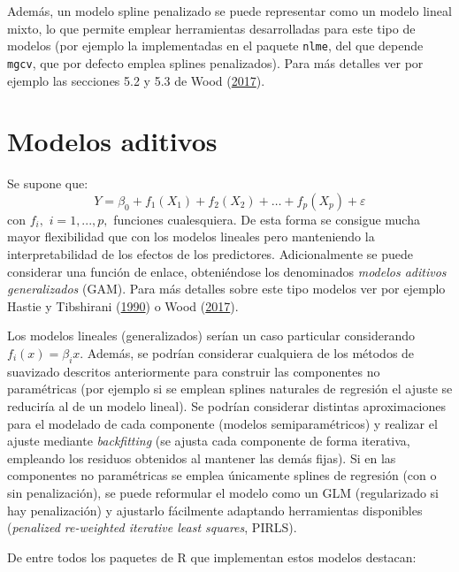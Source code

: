 \documentclass[
  spanish,
]{book}
\theoremstyle{break}
\theoremstyle{definition}
\theoremstyle{definition}
\theoremstyle{definition}
\theoremstyle{remark}
\begin{document}
Además, un modelo spline penalizado se puede representar como un modelo lineal mixto, lo que permite emplear herramientas desarrolladas para este tipo de modelos (por ejemplo la implementadas en el paquete \texttt{nlme}, del que depende \texttt{mgcv}, que por defecto emplea splines penalizados).
Para más detalles ver por ejemplo las secciones 5.2 y 5.3 de Wood (\protect\hyperlink{ref-wood2017generalized}{2017}).

\hypertarget{modelos-aditivos}{%
\section{Modelos aditivos}\label{modelos-aditivos}}

Se supone que:
\[Y= \beta_{0} + f_1(X_1) + f_2(X_2) + \ldots + f_p(X_p)  + \varepsilon\]
con \(f_{i},\) \(i=1,...,p,\) funciones cualesquiera.
De esta forma se consigue mucha mayor flexibilidad que con los modelos lineales pero manteniendo la interpretabilidad de los efectos de los predictores.
Adicionalmente se puede considerar una función de enlace, obteniéndose los denominados \emph{modelos aditivos generalizados} (GAM). Para más detalles sobre este tipo modelos ver por ejemplo Hastie y Tibshirani (\protect\hyperlink{ref-hastie1990generalized}{1990}) o Wood (\protect\hyperlink{ref-wood2017generalized}{2017}).

Los modelos lineales (generalizados) serían un caso particular considerando \(f_{i}(x) = \beta_{i}x\).
Además, se podrían considerar cualquiera de los métodos de suavizado descritos anteriormente para construir las componentes no paramétricas (por ejemplo si se emplean splines naturales de regresión el ajuste se reduciría al de un modelo lineal).
Se podrían considerar distintas aproximaciones para el modelado de cada componente (modelos semiparamétricos) y realizar el ajuste mediante \emph{backfitting} (se ajusta cada componente de forma iterativa, empleando los residuos obtenidos al mantener las demás fijas).
Si en las componentes no paramétricas se emplea únicamente splines de regresión (con o sin penalización), se puede reformular el modelo como un GLM (regularizado si hay penalización) y ajustarlo fácilmente adaptando herramientas disponibles (\emph{penalized re-weighted iterative least squares}, PIRLS).

De entre todos los paquetes de R que implementan estos modelos destacan:
\end{document}
